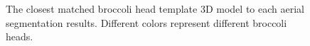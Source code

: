 \begin{figure}[htb!]
  \begin{center}
  \end{center}
  \caption[The closest matched broccoli head template 3D model]{
    The closest matched broccoli head template 3D model to each aerial segmentation results. Different colors represent different broccoli heads.
  }
  \label{fig:xrs5}
\end{figure}